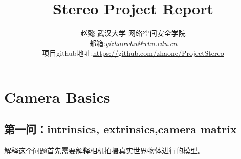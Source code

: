 \documentclass[UTF8]{ctexart}
\begin{document}
\title{Stereo Project Report}
\author{赵懿-武汉大学 网络空间安全学院\\
邮箱:\textit{yizhaowhu@whu.edu.cn}\\
项目github地址:\url{https://github.com/zhaone/ProjectStereo}}
\maketitle
\newpage
\tableofcontents
\newpage
\section{Camera Basics}
\subsection{第一问：intrinsics, extrinsics,camera matrix}
解释这个问题首先需要解释相机拍摄真实世界物体进行的模型。
\end{document}
